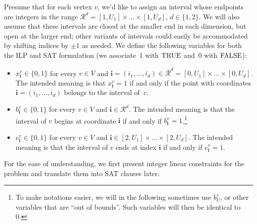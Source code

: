 \documentclass[runningheads]{llncs}
\newcommand{\true}{\ensuremath{\textnormal{TRUE}}}
\newcommand{\false}{\ensuremath{\textnormal{FALSE}}}
\newcommand{\bvec}[1]{\mathbf{#1}}
\newcounter{constr}
\begin{document}
\iffalse

Presume that for each vertex $v$, we'd like to assign an interval
whose endpoints are integers in the range 
$\mathcal R^d = [1,U_1] \times \ldots \times [1, U_d]$, $d \in \{ 1,2\}$.
  We will also assume that these intervals are closed at the 
  smaller end in each dimension, but open at the larger end; other
variants of intervals could easily be accommodated by shifting
indices by $\pm 1$ as needed.  We define the following variables
for both the ILP and SAT formulation (we associate~1 with $\true$ 
and~0 with $\false$):
\begin{itemize}
\item $x_\bvec{i}^v\in \{0,1\}$ for every $v\in V$ and 
$\bvec{i} = (i_1, \ldots, i_d)\in 
 \bar{\mathcal R}^d = [0,U_1] \times \ldots \times [0, U_d]$.
	The intended meaning is that $x_\bvec{i}^v=1$ if and only if the point
	with coordinates $\bvec{i} = (i_1, \ldots, i_d)$
	 belongs to the interval of~$v$.  
\item $b_\bvec{i}^v\in \{0,1\}$ for every $v\in V$ 
	and $\bvec{i}\in \mathcal R^d$.
	The intended meaning is that the interval of $v$ begins at
	coordinate $\bvec{i}$ if and only if $b_\bvec{i}^v=1$.\footnote{To make notations easier, we will in the following sometimes
use $b_{U}^v$, or other variables that are ``out of bounds''.  Such
variables will then be identical to 0.}
\item $e_\bvec{i}^v\in \{0,1\}$ for every $v\in V$ 
	and $\bvec{i}\in [2,U_1] \times \ldots \times [2, U_d]$.
	The intended meaning is that the interval of $v$ ends at
	index $\bvec{i}$ if and only if $e_\bvec{i}^v=1$.  
\end{itemize}
For the ease of understanding, we first present integer linear constraints
for the problem and translate them into SAT clauses later. 
\end{document}
